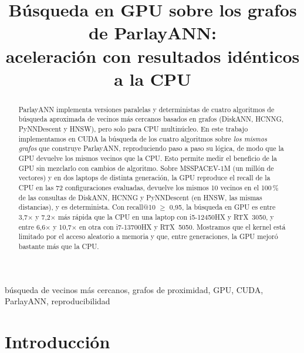 \documentclass[conference,10pt]{IEEEtran}
\newcommand{\x}{$\times$}
\begin{document}
\title{Búsqueda en GPU sobre los grafos de ParlayANN:\\
aceleración con resultados idénticos a la CPU}

\author{
}

\maketitle

\begin{abstract}
ParlayANN implementa versiones paralelas y deterministas de cuatro algoritmos de
búsqueda aproximada de vecinos más cercanos basados en grafos (DiskANN, HCNNG,
PyNNDescent y HNSW), pero solo para CPU multinúcleo. En este trabajo implementamos en
CUDA la búsqueda de los cuatro algoritmos sobre \emph{los mismos grafos} que construye
ParlayANN, reproduciendo paso a paso su lógica, de modo que la GPU devuelve los mismos
vecinos que la CPU. Esto permite medir el beneficio de la GPU sin mezclarlo con cambios
de algoritmo. Sobre MSSPACEV-1M (un millón de vectores) y en dos laptops de distinta
generación, la GPU reproduce el recall de la CPU en las 72 configuraciones evaluadas,
devuelve los mismos 10 vecinos en el 100\,\% de las consultas de DiskANN, HCNNG y
PyNNDescent (en HNSW, las mismas distancias), y es determinista. Con recall@10 $\geq$
0,95, la búsqueda en GPU es entre 3,7\x{} y 7,2\x{} más rápida que la CPU en una laptop
con i5-12450HX y RTX~3050, y entre 6,6\x{} y 10,7\x{} en otra con i7-13700HX y RTX~5050.
Mostramos que el kernel está limitado por el acceso aleatorio a memoria y que, entre
generaciones, la GPU mejoró bastante más que la CPU.
\end{abstract}

\begin{IEEEkeywords}
búsqueda de vecinos más cercanos, grafos de proximidad, GPU, CUDA, ParlayANN,
reproducibilidad
\end{IEEEkeywords}

\section{Introducción}
\end{document}
